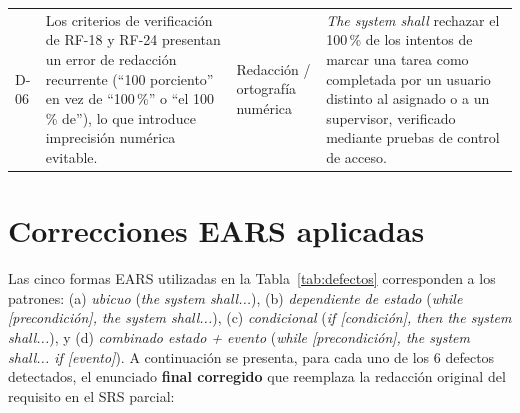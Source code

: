 \documentclass[11pt,a4paper]{report}
\begin{document}
{\begin{longtable}{L{1.3cm}L{4.3cm}L{2.2cm}L{6.8cm}}
D-06 & Los criterios de verificación de RF-18 y RF-24 presentan un error de redacción recurrente (``100 porciento'' en vez de ``100\,\%'' o ``el 100\,\% de''), lo que introduce imprecisión numérica evitable. & Redacción / ortografía numérica & \emph{The system shall} rechazar el 100\,\% de los intentos de marcar una tarea como completada por un usuario distinto al asignado o a un supervisor, verificado mediante pruebas de control de acceso. \\
\end{longtable}
}

\section{Correcciones EARS aplicadas}

Las cinco formas EARS utilizadas en la Tabla~\ref{tab:defectos} corresponden a los patrones: (a) \emph{ubicuo} (\textit{the system shall...}), (b) \emph{dependiente de estado} (\textit{while [precondición], the system shall...}), (c) \emph{condicional} (\textit{if [condici\'on], then the system shall...}), y (d) \emph{combinado estado + evento} (\textit{while [precondici\'on], the system shall... if [evento]}). A continuaci\'on se presenta, para cada uno de los 6 defectos detectados, el enunciado \textbf{final corregido} que reemplaza la redacci\'on original del requisito en el SRS parcial:
\end{document}
